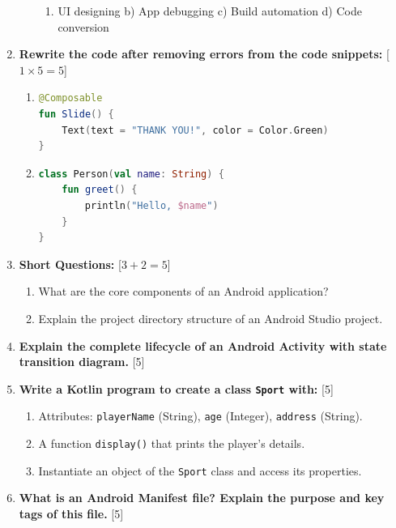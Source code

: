 \documentclass[11pt,a4paper]{article}
\begin{document}
\begin{enumerate}[label=   \textbf{Q\arabic*.}]
\begin{enumerate}[label=\arabic*.]
\begin{enumerate}[label=\alph*)]
            \item UI designing \quad b) App debugging \quad c) Build automation \quad d) Code conversion
        \end{enumerate}
    \end{enumerate}

    \item   \textbf{Rewrite the code after removing errors from the code snippets:} \hfill [$1  \times 5 = 5$]
    
\begin{enumerate}[label=\alph*)]
        \item 
        
\begin{lstlisting}[language=Kotlin]
@Composable
fun Slide() {
    Text(text = "THANK YOU!", color = Color.Green)
}
        \end{lstlisting}
        \item 
        
\begin{lstlisting}[language=Kotlin]
class Person(val name: String) {
    fun greet() {
        println("Hello, $name")
    }
}
        \end{lstlisting}
    \end{enumerate}

    \item   \textbf{Short Questions:} \hfill [$3 + 2 = 5$]
    
\begin{enumerate}[label=\alph*)]
        \item What are the core components of an Android application?
        \item Explain the project directory structure of an Android Studio project.
    \end{enumerate}

    \item   \textbf{Explain the complete lifecycle of an Android Activity with state transition diagram.} \hfill [5]

    \item   \textbf{Write a Kotlin program to create a class   \texttt{Sport} with:} \hfill [5]
    
\begin{enumerate}[label=\alph*)]
        \item Attributes:   \texttt{playerName} (String),   \texttt{age} (Integer),   \texttt{address} (String).
        \item A function   \texttt{display()} that prints the player's details.
        \item Instantiate an object of the   \texttt{Sport} class and access its properties.
    \end{enumerate}

    \item   \textbf{What is an Android Manifest file? Explain the purpose and key tags of this file.} \hfill [5]
\end{enumerate}
\end{document}
